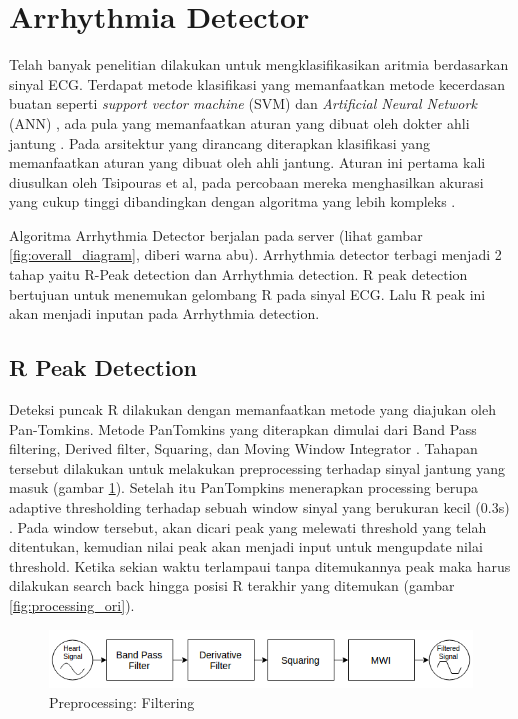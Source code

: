 \documentclass[conference]{IEEEtran}
\begin{document}
\section{Arrhythmia Detector}
Telah banyak penelitian dilakukan untuk mengklasifikasikan aritmia berdasarkan sinyal ECG. Terdapat metode klasifikasi yang memanfaatkan metode kecerdasan buatan seperti \textit{support vector machine} (SVM) \cite{aritmia_svm} dan \textit{Artificial Neural Network} (ANN) \cite{aritmia_ann}, ada pula yang memanfaatkan aturan yang dibuat oleh dokter ahli jantung \cite{tsipouras}. Pada arsitektur yang dirancang diterapkan klasifikasi yang memanfaatkan aturan yang dibuat oleh ahli jantung. Aturan ini pertama kali diusulkan oleh Tsipouras et al, pada percobaan mereka menghasilkan akurasi yang cukup tinggi dibandingkan dengan algoritma yang lebih kompleks \cite{tsipouras}.

Algoritma Arrhythmia Detector berjalan pada server (lihat gambar \ref{fig:overall_diagram}, diberi warna abu). Arrhythmia detector terbagi menjadi 2 tahap yaitu R-Peak detection dan Arrhythmia detection. R peak detection bertujuan untuk menemukan gelombang R pada sinyal ECG. Lalu R peak ini akan menjadi inputan pada Arrhythmia detection.

\subsection{R Peak Detection}
Deteksi puncak R dilakukan dengan memanfaatkan metode yang diajukan oleh Pan-Tomkins. Metode PanTomkins yang diterapkan dimulai dari Band Pass filtering, Derived filter, Squaring, dan Moving Window Integrator \cite{pantom}. Tahapan tersebut dilakukan untuk melakukan preprocessing terhadap sinyal jantung yang masuk (gambar \ref{fig:preprocessing}). Setelah itu PanTompkins menerapkan processing berupa adaptive thresholding terhadap sebuah window sinyal yang berukuran kecil (0.3s) \cite{pantom}. Pada window tersebut, akan dicari peak yang melewati threshold yang telah ditentukan, kemudian nilai peak akan menjadi input untuk  mengupdate nilai threshold. Ketika sekian waktu terlampaui tanpa ditemukannya peak maka harus dilakukan search back hingga posisi R terakhir yang ditemukan (gambar \ref{fig:processing_ori}).

\begin{figure}[htbp]
\centerline{\includegraphics[scale=0.4]{images/preprocessing.png}}
\caption{Preprocessing: Filtering}
\label{fig:preprocessing}
\end{figure}
\end{document}
